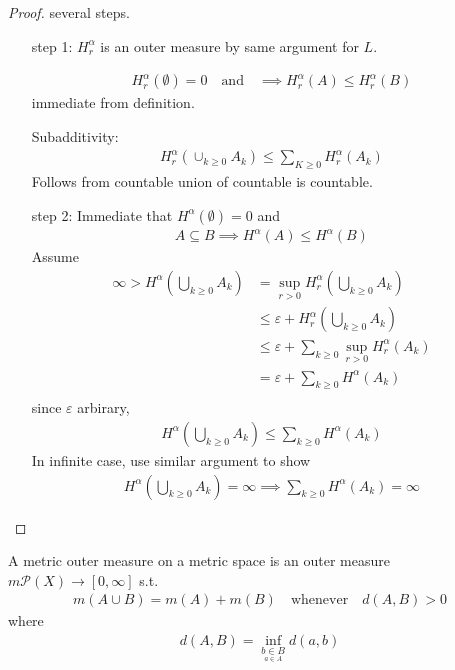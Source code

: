 \begin{proof} several steps.
	\begin{enumerate}
		\item[step 1:] $H_{r}^{\alpha}$ is an outer measure by same argument for $L$.

			\begin{align*}
			H_{r}^{\alpha} (\emptyset)= 0 \quad \text{and} \quad \implies H_{r}^{\alpha} (A) \leq H_{r}^{\alpha} (B)
			\end{align*} 
			immediate from definition.

			Subadditivity:
			\begin{align*}
			H_{r}^{\alpha} ( \cup_{k \geq 0} A_{k}) \leq \sum_{K \geq 0} H_{r}^{\alpha} (A_k)
			\end{align*} Follows from countable union of countable is countable.

		\item[step 2:] Immediate that $H^{\alpha} (\emptyset) = 0$ and 
			\begin{align*}
			A \subseteq B \implies H^{\alpha} (A) \leq H^{\alpha}(B)
			\end{align*} Assume
			\begin{align*}
				\infty > H^{\alpha}( \bigcup_{k \geq 0} A_k ) &= \sup_{r > 0} H_{r}^{\alpha} ( \bigcup_{k \geq 0} A_k) \\
															  &\leq \varepsilon + H_{r}^{\alpha} ( \bigcup_{k \geq 0} A_k) \\ 
															  &\leq \varepsilon +  \sum_{k \geq 0} \sup_{r > 0} H_{r}^{\alpha} ( A_k) \\ 
															  &= \varepsilon +  \sum_{k \geq 0} H^{\alpha} ( A_k) \\ 
			\end{align*} since $\varepsilon$ arbirary, 
			\begin{align*}
			H^{\alpha} ( \bigcup_{k \geq 0} A_k) \leq \sum_{k \geq 0} H^{\alpha} ( A_k)
			\end{align*}
			In infinite case, use similar argument to show
		\begin{align*}
					H^{\alpha} ( \bigcup_{k \geq 0} A_k) = \infty \implies \sum_{k \geq 0} H^{\alpha} ( A_k) = \infty
		\end{align*} 
	\end{enumerate}
\end{proof}

\begin{definition}
	A metric outer measure on a metric space is an outer measure $m \mathcal{P}(X) \to [0,\infty]$ s.t. 
	\begin{align*}
	m(A \cup B) = m(A) + m(B) \quad \text{whenever} \quad d(A,B) > 0
	\end{align*} 
	where  
	\begin{align*}
		d(A,B) = \inf_{\underset{a \in A}{b \in B}} d(a,b)
	\end{align*} 
\end{definition}


